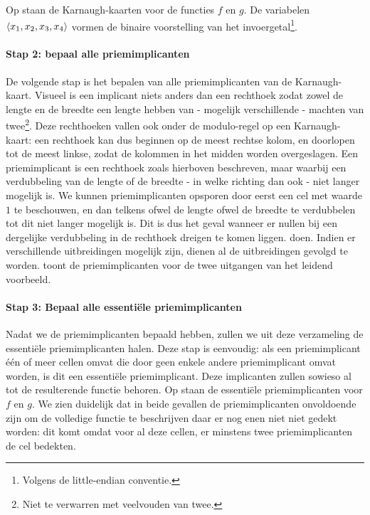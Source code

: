 
Op  staan de Karnaugh-kaarten voor de functies $f$ en $g$. De variabelen $\left\langle x_1,x_2,x_3,x_4 \right\rangle$ vormen de binaire voorstelling van het invoergetal\footnote{Volgens de little-endian conventie.}.

\paragraph{Stap 2: bepaal alle priemimplicanten}
De volgende stap is het bepalen van alle priemimplicanten van de Karnaugh-kaart. Visueel is een implicant niets anders dan een rechthoek zodat zowel de lengte en de breedte een lengte hebben van - mogelijk verschillende - machten van twee\footnote{Niet te verwarren met veelvouden van twee.}. Deze rechthoeken vallen ook onder de modulo-regel op een Karnaugh-kaart: een rechthoek kan dus beginnen op de meest rechtse kolom, en doorlopen tot de meest linkse, zodat de kolommen in het midden worden overgeslagen. Een priemimplicant is een rechthoek zoals hierboven beschreven, maar waarbij een verdubbeling van de lengte of de breedte - in welke richting dan ook - niet langer mogelijk is. We kunnen priemimplicanten opsporen door eerst een cel met waarde $1$ te beschouwen, en dan telkens ofwel de lengte ofwel de breedte te verdubbelen tot dit niet langer mogelijk is. Dit is dus het geval wanneer er nullen bij een dergelijke verdubbeling in de rechthoek dreigen te komen liggen. doen. Indien er verschillende uitbreidingen mogelijk zijn, dienen al de uitbreidingen gevolgd te worden.  toont de priemimplicanten voor de twee uitgangen van het leidend voorbeeld.


\paragraph{Stap 3: Bepaal alle essenti\"ele priemimplicanten}
Nadat we de priemimplicanten bepaald hebben, zullen we uit deze verzameling de essenti\"ele priemimplicanten halen. Deze stap is eenvoudig: als een priemimplicant \'e\'en of meer cellen omvat die door geen enkele andere priemimplicant omvat worden, is dit een essenti\"ele priemimplicant. Deze implicanten zullen sowieso al tot de resulterende functie behoren. Op  staan de essenti\"ele priemimplicanten voor $f$ en $g$. We zien duidelijk dat in beide gevallen de priemimplicanten onvoldoende zijn om de volledige functie te beschrijven daar er nog enen niet niet gedekt worden: dit komt omdat voor al deze cellen, er minstens twee priemimplicanten de cel bedekten.

